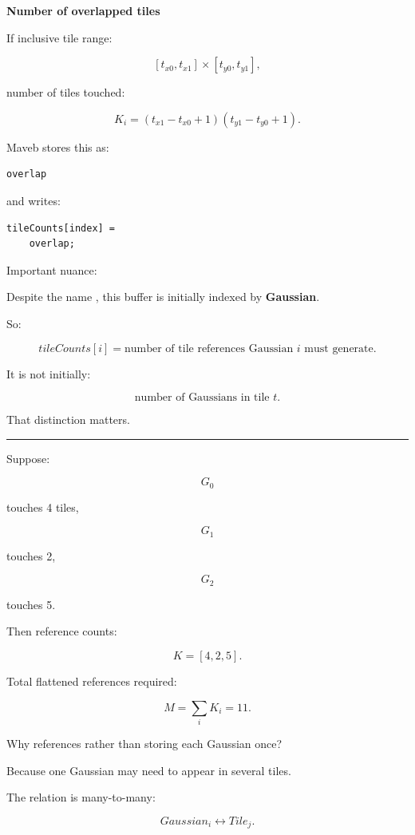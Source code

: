 \textbf{Number of overlapped tiles}

If inclusive tile range:

\[
[t_{x0},t_{x1}]
\times
[t_{y0},t_{y1}],
\]

number of tiles touched:

\[
\boxed{
K_i
=
(t_{x1}-t_{x0}+1)
(t_{y1}-t_{y0}+1).
}
\]

Maveb stores this as:

\begin{verbatim}
overlap
\end{verbatim}

and writes:

\begin{verbatim}
tileCounts[index] =
    overlap;
\end{verbatim}

Important nuance:

Despite the name , this buffer is initially indexed by \textbf{Gaussian}.

So:

\[
tileCounts[i]
=
\text{number of tile references Gaussian }i\text{ must generate}.
\]

It is not initially:

\[
\text{number of Gaussians in tile }t.
\]

That distinction matters.

\begin{center}\rule{0.5\linewidth}{0.5pt}\end{center}

Suppose:

\[
G_0
\]

touches 4 tiles,

\[
G_1
\]

touches 2,

\[
G_2
\]

touches 5.

Then reference counts:

\[
K=
[4,2,5].
\]

Total flattened references required:

\[
\boxed{
M=
\sum_i K_i
=
11.
}
\]

Why references rather than storing each Gaussian once?

Because one Gaussian may need to appear in several tiles.

The relation is many-to-many:

\[
Gaussian_i
\leftrightarrow
Tile_j.
\]

